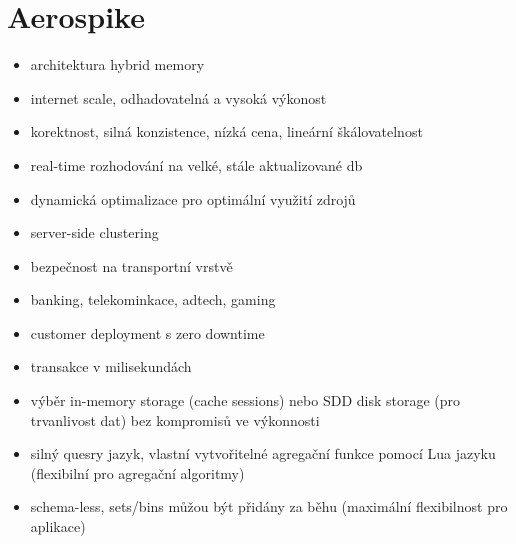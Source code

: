 \documentclass[czech,bachelor,dept460,male,csharp,cpdeclaration]{diploma}
\begin{document}
		\section{Aerospike}
			\begin{itemize}
				\item architektura hybrid memory
				\item internet scale, odhadovatelná a vysoká výkonost
				\item korektnost, silná konzistence, nízká cena, lineární škálovatelnost
				\item real-time rozhodování na velké, stále aktualizované db
				\item dynamická optimalizace pro optimální využití zdrojů
				\item server-side clustering
				\item bezpečnost na transportní vrstvě
				\item banking, telekominkace, adtech, gaming
				\item customer deployment s zero downtime
				\item transakce v milisekundách
				\item výběr in-memory storage (cache sessions) nebo SDD disk storage (pro trvanlivost dat) bez kompromisů ve výkonnosti
				\item silný quesry jazyk, vlastní vytvořitelné agregační funkce pomocí Lua jazyku (flexibilní pro agregační algoritmy)
				\item schema-less, sets/bins můžou být přidány za běhu (maximální flexibilnost pro aplikace)
			\end{itemize}
		 
		
\end{document}
